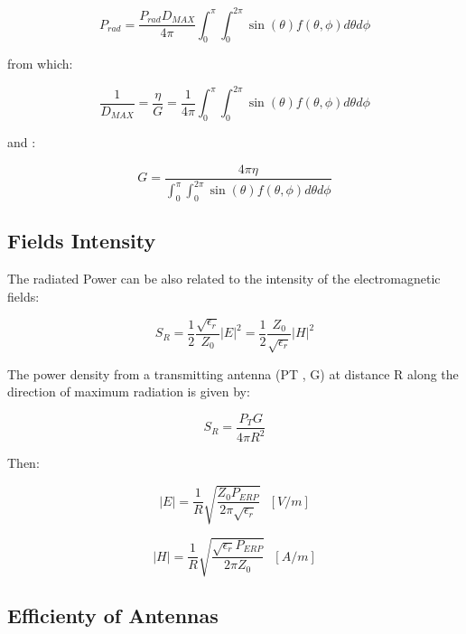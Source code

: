 \begin{equation}
	P_{rad} = \frac {P_{rad}D_{MAX}}{4 \pi}\int_0^{ \pi}\int_0^{2 \pi} \sin(\theta) f(\theta, \phi) d\theta d\phi
\end{equation}

from which:

\begin{equation}
	\frac{1}{D_{MAX}}=\frac{\eta}{G}= \frac{1}{4 \pi} \int_0^{\pi}\int_0^{2 \pi} \sin(\theta) f(\theta, \phi) d\theta d\phi
\end{equation}

and :

\begin{equation}
	G =\frac { 4\pi \eta}{\int_0^{ \pi}\int_0^{2 \pi} \sin(\theta) f(\theta, \phi) d\theta d\phi}
\end{equation}

\subsection{Fields Intensity} %
\label{sub:fields_intensity}

The radiated Power can be also related to the intensity of the electromagnetic fields:

\begin{equation}
	S_R=\frac{1}{2}\frac{\sqrt{\epsilon_r}}{Z_0}|E|^2= \frac{1}{2}\frac{Z_0}{\sqrt{\epsilon_r}}|H|^2
\end{equation}

The power density from a transmitting antenna (PT , G)
at distance R along the direction of maximum radiation
is given by: 

\begin{equation}	
S_R= \frac{P_TG}{4 \pi R^2}
\end{equation}


Then:

\begin{equation}
	|E| = \frac{1}{R} \sqrt{\frac{Z_0 P_{ERP}}{2\pi \sqrt{\epsilon_r}}} \ \ \ [V/m]
\end{equation}


\begin{equation}
	|H| = \frac{1}{R} \sqrt{\frac{\sqrt{\epsilon_r} P_{ERP}}{2\pi Z_0}} \ \ \ [A/m]
\end{equation}


\subsection{Efficienty of Antennas} %
\label{sub:efficienty_of_antennas}


